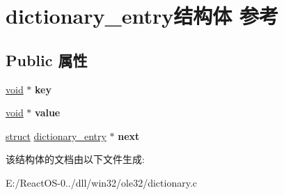 \hypertarget{structdictionary__entry}{}\section{dictionary\+\_\+entry结构体 参考}
\label{structdictionary__entry}
\subsection*{Public 属性}
\begin{DoxyCompactItemize}
\item 
\mbox{\label{structdictionary__entry_ab3d1cb34405f92415e7f8b4fca00a2be}} 
\hyperlink{interfacevoid}{void} $\ast$ {\bfseries key}
\item 
\mbox{\label{structdictionary__entry_ad71c44d183ea3716557244cfdf5a5de0}} 
\hyperlink{interfacevoid}{void} $\ast$ {\bfseries value}
\item 
\mbox{\label{structdictionary__entry_a4303c447296af6ce502701f64308ffe6}} 
\hyperlink{interfacestruct}{struct} \hyperlink{structdictionary__entry}{dictionary\+\_\+entry} $\ast$ {\bfseries next}
\end{DoxyCompactItemize}


该结构体的文档由以下文件生成\+:\begin{DoxyCompactItemize}
\item 
E\+:/\+React\+O\+S-\/0../dll/win32/ole32/dictionary.\+c\end{DoxyCompactItemize}
